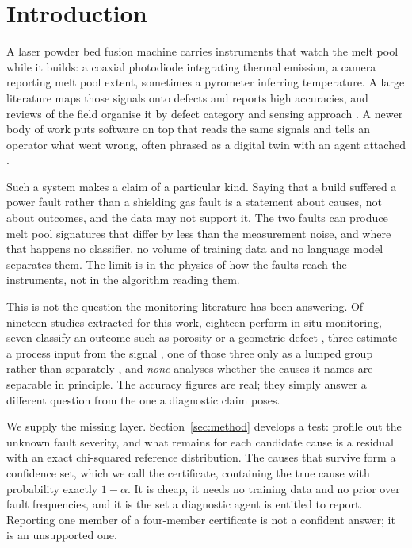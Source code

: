 \documentclass[preprint,12pt]{elsarticle}
\begin{document}
\section{Introduction}
\label{sec:intro}

A laser powder bed fusion machine carries instruments that watch the melt pool
while it builds: a coaxial photodiode integrating thermal emission, a camera
reporting melt pool extent, sometimes a pyrometer inferring temperature. A large
literature maps those signals onto defects and reports high accuracies, and
reviews of the field organise it by defect category and sensing approach
\cite{Grasso2017,Scime2019,Bugatti2022}. A newer
body of work puts software on top that reads the same signals and tells an
operator what went wrong, often phrased as a digital twin with an agent attached
\cite{Chen2025}.

Such a system makes a claim of a particular kind. Saying that a build suffered a
power fault rather than a shielding gas fault is a statement about causes, not
about outcomes, and the data may not support it. The two faults can produce melt
pool signatures that differ by less than the measurement noise, and where that
happens no classifier, no volume of training data and no language model
separates them. The limit is in the physics of how the faults reach the
instruments, not in the algorithm reading them.

This is not the question the monitoring literature has been answering. Of
nineteen studies extracted for this work, eighteen perform in-situ monitoring,
seven classify an outcome such as porosity or a geometric defect
\cite{Scime2019,Bugatti2022}, three estimate a process input from the signal
\cite{Blanc2024,Reijonen2024,kNN2025}, one of those three only as a lumped group
rather than separately \cite{kNN2025}, and \emph{none} analyses whether the
causes it names are separable in principle. The accuracy figures are real; they
simply answer a different question from the one a diagnostic claim poses.

We supply the missing layer. Section~\ref{sec:method} develops a test: profile
out the unknown fault severity, and what remains for each candidate cause is a
residual with an exact chi-squared reference distribution. The causes that
survive form a confidence set, which we call the certificate, containing the
true cause with probability exactly $1-\alpha$. It is cheap, it needs no
training data and no prior over fault frequencies, and it is the set a
diagnostic agent is entitled to report. Reporting one member of a four-member
certificate is not a confident answer; it is an unsupported one.
\end{document}
